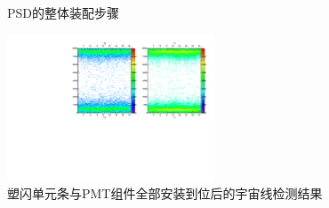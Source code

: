 \begin{figure}[htb]
{}
\caption{PSD的整体装配步骤}
\label{fig:construction:psd_assembly}
\end{figure}
\begin{figure}[!h]
	\centering
	\includegraphics[width=0.55\textwidth,angle=-90]{chap/construction/fig/mipVSstrip.pdf}
	\caption{塑闪单元条与PMT组件全部安装到位后的宇宙线检测结果}
	\label{fig:construction:mipVSstrip}
\end{figure}
%
